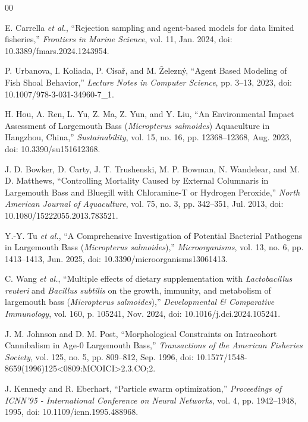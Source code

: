 \documentclass[conference]{IEEEtran}
\begin{document}
\clearpage
\begin{thebibliography}{00}

 E. Carrella \textit{et al.}, ``Rejection sampling and agent-based models for data limited fisheries,'' \textit{Frontiers in Marine Science}, vol. 11, Jan. 2024, doi: 10.3389/fmars.2024.1243954.

 P. Urbanova, I. Koliada, P. Císař, and M. Železný, ``Agent Based Modeling of Fish Shoal Behavior,'' \textit{Lecture Notes in Computer Science}, pp. 3--13, 2023, doi: 10.1007/978-3-031-34960-7\_1.

 H. Hou, A. Ren, L. Yu, Z. Ma, Z. Yun, and Y. Liu, ``An Environmental Impact Assessment of Largemouth Bass (\textit{Micropterus salmoides}) Aquaculture in Hangzhou, China,'' \textit{Sustainability}, vol. 15, no. 16, pp. 12368--12368, Aug. 2023, doi: 10.3390/su151612368.

 J. D. Bowker, D. Carty, J. T. Trushenski, M. P. Bowman, N. Wandelear, and M. D. Matthews, ``Controlling Mortality Caused by External Columnaris in Largemouth Bass and Bluegill with Chloramine-T or Hydrogen Peroxide,'' \textit{North American Journal of Aquaculture}, vol. 75, no. 3, pp. 342--351, Jul. 2013, doi: 10.1080/15222055.2013.783521.

 Y.-Y. Tu \textit{et al.}, ``A Comprehensive Investigation of Potential Bacterial Pathogens in Largemouth Bass (\textit{Micropterus salmoides}),'' \textit{Microorganisms}, vol. 13, no. 6, pp. 1413--1413, Jun. 2025, doi: 10.3390/microorganisms13061413.

 C. Wang \textit{et al.}, ``Multiple effects of dietary supplementation with \textit{Lactobacillus reuteri} and \textit{Bacillus subtilis} on the growth, immunity, and metabolism of largemouth bass (\textit{Micropterus salmoides}),'' \textit{Developmental \& Comparative Immunology}, vol. 160, p. 105241, Nov. 2024, doi: 10.1016/j.dci.2024.105241.

 J. M. Johnson and D. M. Post, ``Morphological Constraints on Intracohort Cannibalism in Age-0 Largemouth Bass,'' \textit{Transactions of the American Fisheries Society}, vol. 125, no. 5, pp. 809--812, Sep. 1996, doi: 10.1577/1548-8659(1996)125\textless{}0809:MCOICI\textgreater{}2.3.CO;2.

 J. Kennedy and R. Eberhart, ``Particle swarm optimization,'' \textit{Proceedings of ICNN'95 - International Conference on Neural Networks}, vol. 4, pp. 1942--1948, 1995, doi: 10.1109/icnn.1995.488968.


\end{thebibliography}
\end{document}
